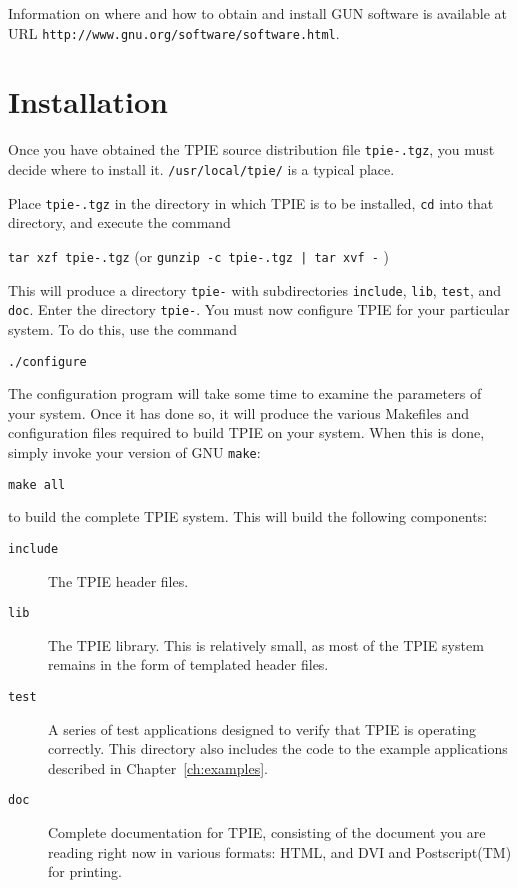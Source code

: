 Information on where and how to obtain and install GUN software is
available at URL {\tt http://www.gnu.org/software/software.html}.


\section{Installation}

Once you have obtained the TPIE source distribution file
{\tt tpie-\version.tgz}, you must decide where to install it.
\verb|/usr/local/tpie/| is a typical place.

Place {\tt tpie-\version.tgz} in the directory in which TPIE is to
be installed, \verb|cd| into that directory, and execute the command

\begin{flushleft}
{\tt tar xzf tpie-\version.tgz}
(or {\tt gunzip -c tpie-\version.tgz | tar xvf -} )  
\end{flushleft}

This will produce a directory {\tt tpie-\version} with subdirectories
\verb|include|, \verb|lib|, \verb|test|, and \verb|doc|.  Enter the
directory {\tt tpie-\version}.  You must now configure TPIE for your
particular system.  To do this, use the command

\begin{verbatim}
./configure
\end{verbatim}

The configuration program will take some time to
examine the parameters of your system.  Once it has done so, it will
produce the various Makefiles and configuration files required to
build TPIE on your system.  When this is done, simply invoke your version
of GNU \verb|make|:

\begin{verbatim}
make all
\end{verbatim}

to build the complete TPIE system.  This will build the following
components:

\begin{description}
\item[\verb|include|] The TPIE header files.
\item[\verb|lib|] The TPIE library.  This is relatively small, as most
  of the TPIE system remains in the form of templated header
  files.
\item[\verb|test|] A series of test applications designed to verify
  that TPIE is operating correctly.  This directory also includes the
  code to the example applications described in
  Chapter~\ref{ch:examples}.
\item[\verb|doc|] Complete documentation for TPIE, consisting of the
  document you are reading right now in various formats: HTML, and DVI and
  Postscript(TM) for printing.
\end{description}






